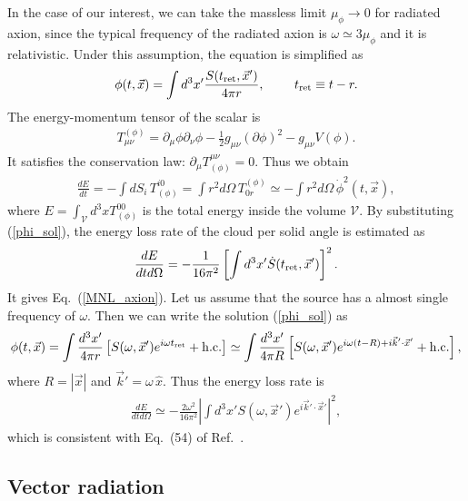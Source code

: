 \documentclass[%
 preprint,
 nofootinbib,
 amsmath,amssymb,
 aps,
 a4paper
]{revtex4-1}
\begin{document}
In the case of our interest, we can take the massless limit $\mu_\phi\to 0$ for radiated axion, since the typical frequency of the radiated axion is $\omega \simeq 3\mu_\phi$ and it is relativistic. Under this assumption, the equation is simplified as
\begin{align}
	\phi(t,\vec x) = \int d^3x' \frac{S(t_{\rm ret},\vec x')}{4\pi r},~~~~~~~t_{\rm ret} \equiv t- r.    \label{phi_sol}
\end{align}
The energy-momentum tensor of the scalar is
\begin{align}
	T^{(\phi)}_{\mu\nu} = \partial_\mu\phi\partial_\nu \phi- \frac{1}{2}g_{\mu\nu}(\partial\phi)^2 - g_{\mu\nu}V(\phi).
\end{align}
It satisfies the conservation law: $\partial_\mu T^{\mu\nu}_{(\phi)} = 0$. Thus we obtain
\begin{align}
	\frac{dE}{dt} = -\int dS_i\,T^{i0}_{(\phi)}= \int r^2 d\Omega\,T^{(\phi)}_{0r} \simeq - \int r^2 d\Omega\,\dot\phi^2(t,\vec x),
\end{align}
where $E = \int_{\mathcal V} d^3x T^{00}_{(\phi)}$ is the total energy inside the volume $\mathcal V$. By substituting (\ref{phi_sol}), the energy loss rate of the cloud per solid angle is estimated as
\begin{align}
	\frac{dE}{dt d\Omega} = -\frac{1}{16\pi^2} \left[ \int d^3 x'  \dot S(t_{\rm ret},\vec x') \right]^2. 
\end{align}
It gives Eq.~(\ref{MNL_axion}). 
Let us assume that the source has a almost single frequency of $\omega$. Then we can write the solution (\ref{phi_sol}) as  
\begin{align}
	\phi(t,\vec x) = \int \frac{d^3x'}{4\pi r} \left[S(\omega,\vec x') e^{i\omega t_{\rm ret}} + {\rm h.c.}\right]
	\simeq  \int \frac{d^3x'}{4\pi R}\left[S(\omega,\vec x') e^{i\omega(t-R)+i\vec k' \cdot \vec x'} + {\rm h.c.}\right],
\end{align}
where $R = |\vec x|$ and $\vec k' = \omega\,\hat x$. Thus the energy loss rate is
\begin{align}
	\frac{dE}{dt d\Omega} \simeq - \frac{2\omega^2}{16\pi^2}  \left| \int d^3x' S(\omega,\vec x') e^{i\vec k'\cdot \vec x'} \right|^2,
\end{align}
which is consistent with Eq.~(54) of Ref.~\cite{Arvanitaki:2010sy}.


\subsection{Vector radiation}  
\end{document}
